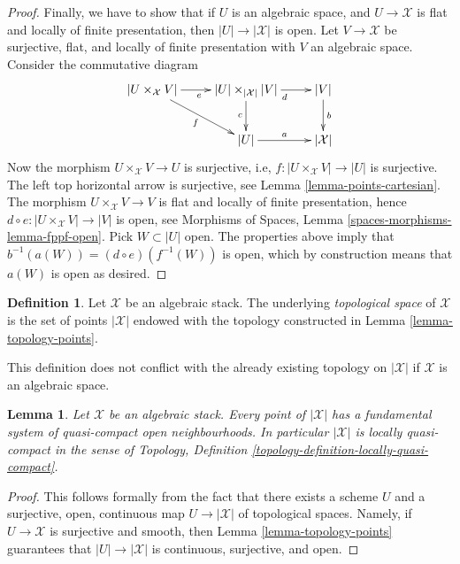 \documentclass{stacks-project}
\theoremstyle{plain}
\newtheorem{lemma}[subsection]{Lemma}
\theoremstyle{definition}
\newtheorem{definition}[subsection]{Definition}
\theoremstyle{remark}
\numberwithin{equation}{subsection}
\begin{document}
\begin{proof}
\medskip\noindent
Finally, we have to show that if $U$ is an algebraic space, and
$U \to \mathcal{X}$ is flat and locally of finite presentation, then
$|U| \to |\mathcal{X}|$ is open. Let $V \to \mathcal{X}$ be surjective,
flat, and locally of finite presentation with $V$ an algebraic space.
Consider the commutative diagram
$$
\xymatrix{
|U \times_\mathcal{X} V| \ar[r]_e \ar[rd]_f &
|U| \times_{|\mathcal{X}|} |V| \ar[d]_c \ar[r]_d &
|V| \ar[d]^b \\
& |U| \ar[r]^a & |\mathcal{X}|
}
$$
Now the morphism $U \times_\mathcal{X} V \to U$ is surjective, i.e,
$f : |U \times_\mathcal{X} V| \to |U|$ is surjective.
The left top horizontal arrow is surjective, see
Lemma \ref{lemma-points-cartesian}.
The morphism $U \times_\mathcal{X} V \to V$ is flat and locally of finite
presentation, hence $d \circ e : |U \times_\mathcal{X} V| \to |V|$ is open,
see
Morphisms of Spaces, Lemma \ref{spaces-morphisms-lemma-fppf-open}.
Pick $W \subset |U|$ open. The properties above imply that
$b^{-1}(a(W)) = (d \circ e)(f^{-1}(W))$ is open, which by construction means
that $a(W)$ is open as desired.
\end{proof}

\begin{definition}
\label{definition-topological-space}
Let $\mathcal{X}$ be an algebraic stack.
The underlying {\it topological space} of $\mathcal{X}$ is the set of points
$|\mathcal{X}|$ endowed with the topology constructed in
Lemma \ref{lemma-topology-points}.
\end{definition}

\noindent
This definition does not conflict with the already existing topology
on $|\mathcal{X}|$ if $\mathcal{X}$ is an algebraic space.

\begin{lemma}
\label{lemma-space-locally-quasi-compact}
Let $\mathcal{X}$ be an algebraic stack.
Every point of $|\mathcal{X}|$ has a fundamental system of
quasi-compact open neighbourhoods.
In particular $|\mathcal{X}|$ is locally quasi-compact in the sense of
Topology, Definition \ref{topology-definition-locally-quasi-compact}.
\end{lemma}

\begin{proof}
This follows formally from the fact that there exists a scheme
$U$ and a surjective, open, continuous map $U \to |\mathcal{X}|$
of topological spaces. Namely, if $U \to \mathcal{X}$ is surjective and
smooth, then
Lemma \ref{lemma-topology-points}
guarantees that $|U| \to |\mathcal{X}|$ is continuous, surjective, and open.
\end{proof}
\end{document}
